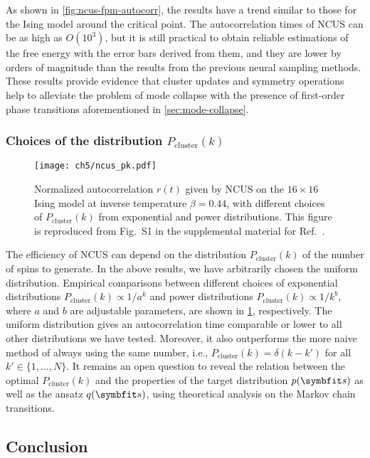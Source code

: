 As shown in \cref{fig:ncus-fpm-autocorr}, the results have a trend similar to those for the Ising model around the critical point. The autocorrelation times of NCUS can be as high as $O(10^3)$, but it is still practical to obtain reliable estimations of the free energy with the error bars derived from them, and they are lower by orders of magnitude than the results from the previous neural sampling methods. These results provide evidence that cluster updates and symmetry operations help to alleviate the problem of mode collapse with the presence of first-order phase transitions aforementioned in \cref{sec:mode-collapse}.

\subsubsection{Choices of the distribution $P_\text{cluster}(k)$}

\begin{figure}[htb]
\centering
\texttt{[image: ch5/ncus\_pk.pdf]}
\caption[Choices of the distribution $P_\text{cluster}(k)$ in NCUS]{
Normalized autocorrelation $r(t)$ given by NCUS on the $16 \times 16$ Ising model at inverse temperature $\beta = 0.44$, with different choices of $P_\text{cluster}(k)$ from exponential and power distributions.
This figure is reproduced from Fig.~S1 in the supplemental material for Ref.~\cite{wu2021unbiased}.
}
\label{fig:ncus-pk}
\end{figure}

The efficiency of NCUS can depend on the distribution $P_\text{cluster}(k)$ of the number of spins to generate. In the above results, we have arbitrarily chosen the uniform distribution. Empirical comparisons between different choices of exponential distributions $P_\text{cluster}(k) \propto 1 / a^k$ and power distributions $P_\text{cluster}(k) \propto 1 / k^b$, where $a$ and $b$ are adjustable parameters, are shown in \cref{fig:ncus-pk}, respectively. The uniform distribution gives an autocorrelation time comparable or lower to all other distributions we have tested. Moreover, it also outperforms the more naive method of always using the same number, i.e., $P_\text{cluster}(k) = \delta(k - k')$ for all $k' \in \{1, \ldots, N\}$. It remains an open question to reveal the relation between the optimal $P_\text{cluster}(k)$ and the properties of the target distribution $p(\vs)$ as well as the ansatz $q(\vs)$, using theoretical analysis on the Markov chain transitions.

\subsection{Conclusion}


